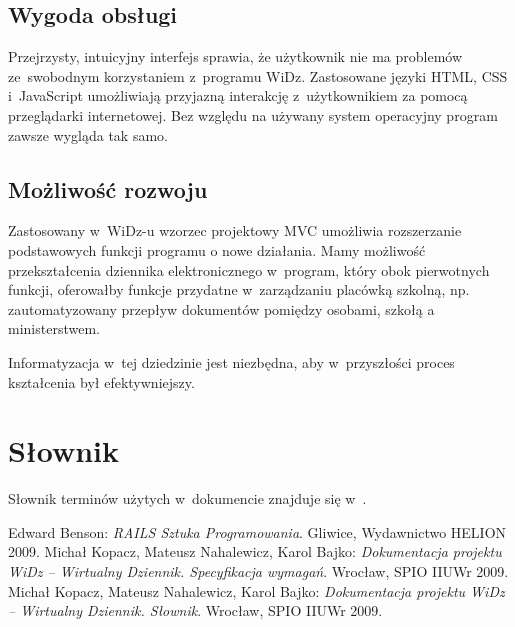 \documentclass[12pt,leqno,twoside]{mwart}
\begin{document}
\subsection{Wygoda obsługi}
\noindent Przejrzysty, intuicyjny interfejs sprawia, że użytkownik nie ma problemów ze~swobodnym korzystaniem z~programu WiDz. Zastosowane języki HTML, CSS i~JavaScript umożliwiają przyjazną interakcję z~użytkownikiem za pomocą przeglądarki internetowej. Bez względu na używany system operacyjny program zawsze wygląda tak samo.

\subsection{Możliwość rozwoju}
\noindent Zastosowany w~WiDz-u wzorzec projektowy MVC umożliwia rozszerzanie podstawowych funkcji programu o nowe działania. Mamy możliwość przekształcenia dziennika elektronicznego w~program, który obok pierwotnych funkcji, oferowałby funkcje przydatne w~zarządzaniu placówką szkolną, np. zautomatyzowany przepływ dokumentów pomiędzy osobami, szkołą a ministerstwem.

\indent Informatyzacja w~tej dziedzinie jest niezbędna, aby w~przyszłości proces kształcenia był efektywniejszy.

\section{Słownik}
\noindent Słownik terminów użytych w~dokumencie znajduje się w~\cite{SLO}.

\begin{thebibliography}{99}
 Edward Benson: {\it RAILS Sztuka Programowania}. Gliwice, Wydawnictwo HELION 2009.
 Michał Kopacz, Mateusz Nahalewicz, Karol Bajko: {\it Dokumentacja projektu WiDz -- Wirtualny Dziennik. Specyfikacja wymagań}. Wrocław, SPIO IIUWr 2009.
 Michał Kopacz, Mateusz Nahalewicz, Karol Bajko: {\it Dokumentacja projektu WiDz -- Wirtualny Dziennik. Słownik}. Wrocław, SPIO IIUWr 2009.
\end{thebibliography}
\end{document}
